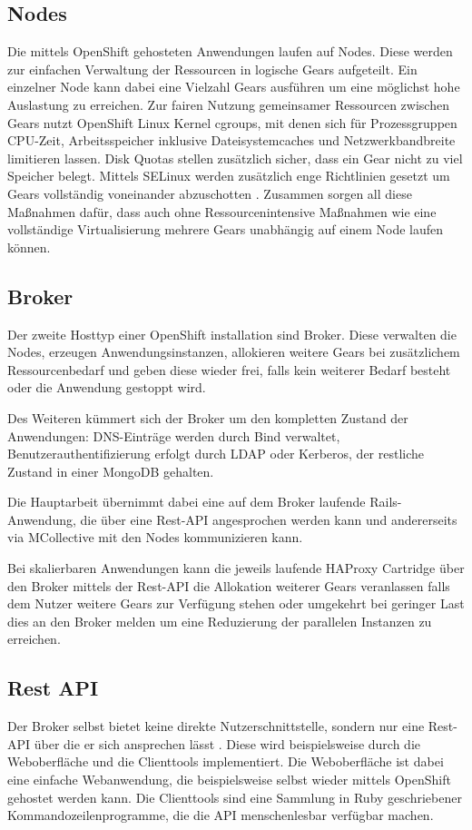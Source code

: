 \documentclass[10pt,a4paper,compsoc]{IEEEtran}
\begin{document}
\subsection{Nodes}
Die mittels OpenShift gehosteten Anwendungen laufen auf Nodes. Diese werden zur einfachen Verwaltung der Ressourcen in logische Gears aufgeteilt. Ein einzelner Node kann dabei eine Vielzahl Gears ausführen um eine möglichst hohe Auslastung zu erreichen. Zur fairen Nutzung gemeinsamer Ressourcen zwischen Gears nutzt OpenShift Linux Kernel cgroups, mit denen sich für Prozessgruppen CPU-Zeit, Arbeitsspeicher inklusive Dateisystemcaches und Netzwerkbandbreite limitieren lassen. Disk Quotas stellen zusätzlich sicher, dass ein Gear nicht zu viel Speicher belegt. Mittels SELinux werden zusätzlich enge Richtlinien gesetzt um Gears vollständig voneinander abzuschotten \cite[3.5]{os_buildyourown}. Zusammen sorgen all diese Maßnahmen dafür, dass auch ohne Ressourcenintensive Maßnahmen wie eine vollständige Virtualisierung mehrere Gears unabhängig auf einem Node laufen können.

\subsection{Broker}
Der zweite Hosttyp einer OpenShift installation sind Broker. Diese verwalten die Nodes, erzeugen Anwendungsinstanzen, allokieren weitere Gears bei zusätzlichem Ressourcenbedarf und geben diese wieder frei, falls kein weiterer Bedarf besteht oder die Anwendung gestoppt wird.

Des Weiteren kümmert sich der Broker um den kompletten Zustand der Anwendungen: DNS-Einträge werden durch Bind verwaltet, Benutzerauthentifizierung erfolgt durch LDAP oder Kerberos, der restliche Zustand in einer MongoDB gehalten.

Die Hauptarbeit übernimmt dabei eine auf dem Broker laufende Rails-Anwendung, die über eine Rest-API
angesprochen werden kann und andererseits via MCollective mit den Nodes kommunizieren kann.

Bei skalierbaren Anwendungen kann die jeweils laufende HAProxy Cartridge über den Broker mittels der Rest-API die Allokation weiterer Gears veranlassen falls dem Nutzer weitere Gears zur Verfügung stehen oder umgekehrt bei geringer Last dies an den Broker melden um eine Reduzierung der parallelen Instanzen zu erreichen.

\subsection{Rest API}
Der Broker selbst bietet keine direkte Nutzerschnittstelle, sondern nur eine Rest-API über die er sich ansprechen lässt \cite{os_rest}. Diese wird beispielsweise durch die Weboberfläche und die Clienttools implementiert.
Die Weboberfläche ist dabei eine einfache Webanwendung, die beispielsweise selbst wieder mittels OpenShift gehostet werden kann. Die Clienttools sind eine Sammlung in Ruby geschriebener Kommandozeilenprogramme, die die API menschenlesbar verfügbar machen.
\end{document}
